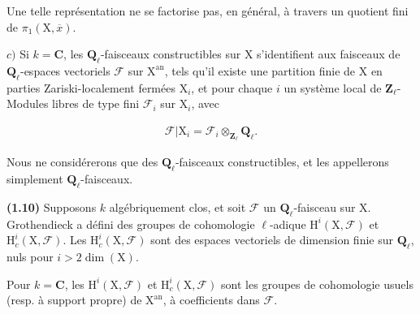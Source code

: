 \documentclass[10pt,leqno]{article}
\begin{document}
\noindent Une telle représentation ne se factorise pas, en général, à travers un quotient fini de \(\pi _{1}(\mathrm{X},\overline{x})\).\par

\noindent \(c)\) Si \(k=\mathbf{C}\), les \(\mathbf{Q}_{\ell }\)-faisceaux constructibles sur \(\mathrm{X}\) s’identifient aux faisceaux de \(\mathbf{Q}_{\ell }\)-espaces vectoriels \(\mathcal{F} \) sur \(\mathrm{X}^{\mathrm{an}}\), tels qu’il existe une partition finie de \(\mathrm{X}\) en parties Zariski-localement fermées \(\mathrm{X}_{i}\), et pour chaque \(i\) un système local de \(\mathbf{Z}_{\ell }\)-Modules libres de type fini \(\mathcal{F} _{i}\) sur \(\mathrm{X}_{i}\), avec\par

\begin{equation*}\begin{gathered}\mathcal{F} |\mathrm{X}_{i} = \mathcal{F} _{i} \otimes _{\mathbf{Z}_{\ell }} \mathbf{Q}_{\ell }.\end{gathered}\end{equation*}

\noindent Nous ne considérerons que des \(\mathbf{Q}_{\ell }\)-faisceaux constructibles, et les appellerons simplement \(\mathbf{Q}_{\ell }\)-faisceaux.\par

\noindent \textbf{(1.10)} Supposons \(k\) algébriquement clos, et soit \(\mathcal{F} \) un \(\mathbf{Q}_{\ell }\)-faisceau sur \(\mathrm{X}\). Grothendieck a défini des groupes de cohomologie \(\ell \)-adique \(\mathrm{H}^{i}(\mathrm{X},\mathcal{F} )\) et \(\mathrm{H}_{c}^{i}(\mathrm{X},\mathcal{F} )\). Les \(\mathrm{H}_{c}^{i}(\mathrm{X},\mathcal{F} )\) sont des espaces vectoriels de dimension finie sur \(\mathbf{Q}_{\ell }\), nuls pour \(i>2 \operatorname{dim}(\mathrm{X})\).\par

\clearpage

\label{physical-7}\par\smallskip

\noindent Pour \(k=\mathbf{C}\), les \(\mathrm{H}^{i}(\mathrm{X},\mathcal{F} )\) et \(\mathrm{H}_{c}^{i}(\mathrm{X},\mathcal{F} )\) sont les groupes de cohomologie usuels (resp. à support propre) de \(\mathrm{X}^{\mathrm{an}}\), à coefficients dans \(\mathcal{F} \).\par
\end{document}
